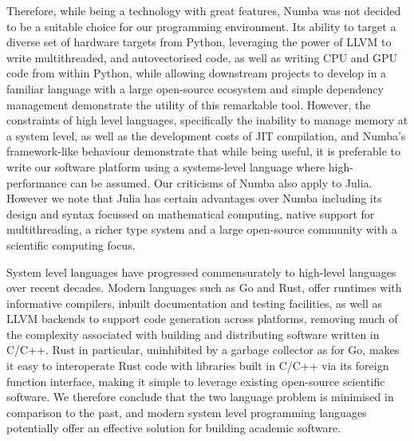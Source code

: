 Therefore, while being a technology with great features, Numba was not decided to be a suitable choice for our programming environment. Its ability to target a diverse set of hardware targets from Python, leveraging the power of LLVM to write multithreaded, and autovectorised code, as well as writing CPU and GPU code from within Python, while allowing downstream projects to develop in a familiar language with a large open-source ecosystem and simple dependency management demonstrate the utility of this remarkable tool. However, the constraints of high level languages, specifically the inability to manage memory at a system level, as well as the development costs of JIT compilation, and Numba's framework-like behaviour demonstrate that while being useful, it is preferable to write our software platform using a systems-level language where high-performance can be assumed. Our criticisms of Numba also apply to Julia. However we note that Julia has certain advantages over Numba including its design and syntax focussed on mathematical computing, native support for multithreading, a richer type system and a large open-source community with a scientific computing focus.

System level languages have progressed commensurately to high-level languages over recent decades. Modern languages such as Go and Rust, offer runtimes with informative compilers, inbuilt documentation and testing facilities, as well as LLVM backends to support code generation across platforms, removing much of the complexity associated with building and distributing software written in C/C++. Rust in particular, uninhibited by a garbage collector as for Go, makes it easy to interoperate Rust code with libraries built in C/C++ via its foreign function interface, making it simple to leverage existing open-source scientific software.  We therefore conclude that the two language problem is minimised in comparison to the past, and modern system level programming languages potentially offer an effective solution for building academic software.

